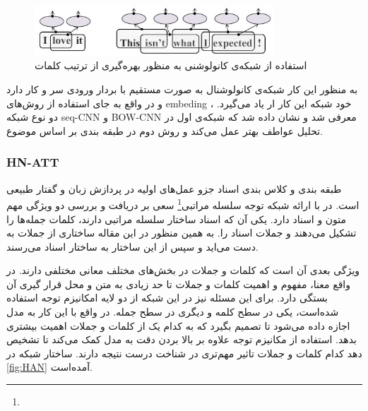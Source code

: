 \documentclass[12pt, a4paper, oneside]{report}
\begin{document}
\begin{figure}[!ht]
    \centering
    \includegraphics[width=0.8\textwidth]{cnn-in-text}
    \caption{ استفاده از شبکه‌ی کانولوشنی به منظور بهره‌گیری از ترتیب کلمات }
    \label{fig:cnn-in-text}
\end{figure}

به منظور این کار شبکه‌ی کانولوشنال به صورت مستقیم با بردار ورودی سر و کار دارد و در واقع به جای استفاده از
روش‌های
embeding
، خود شبکه این کار ار یاد می‌گیرد. دو نوع شبکه
seq-CNN
و
BOW-CNN
معرفی شد و نشان داده شد که شبکه‌ی اول در تحلیل عواطف بهتر عمل می‌کند و روش دوم در طبقه بندی بر اساس موضوع.
\cite{johnson-zhang-2015-effective}

\subsubsection{HN-ATT}

طبقه بندی و کلاس بندی اسناد جزو عمل‌های اولیه در پردازش زبان و گفتار طبیعی است.
در
\cite{yang-etal-2016-hierarchical}
با ارائه شبکه توجه سلسله مراتبی\footnote{}
سعی بر دریافت و بررسی دو ویژگی مهم متون و اسناد دارد. یکی آن که اسناد ساختار سلسله مراتبی دارند، 
کلمات جمله‌ها را تشکیل می‌دهند و جملات اسناد را. به همین منظور در این مقاله ساختاری از جملات به دست می‌اید
و سپس از این ساختار به ساختار اسناد می‌رسند.

ویژگی بعدی آن است که کلمات و جملات در بخش‌های مختلف معانی مختلفی دارند. در واقع معنا، مفهوم و اهمیت
کلمات و جملات تا حد زیادی به متن و محل قرار گیری آن بستگی دارد. برای این مسئله نیز در این شبکه از
دو لایه امکانیزم توجه استفاده شده‌است، یکی در سطح کلمه و دیگری در سطح جمله. در واقع با این کار
به مدل اجازه داده می‌شود تا تصمیم بگیرد که به کدام یک از کلمات و جملات اهمیت بیشتری بدهد.
استفاده از مکانیزم توجه علاوه بر بالا بردن دقت به مدل کمک می‌کند تا تشخیص دهد کدام کلمات و جملات
تاثیر مهم‌تری در شناخت درست نتیجه دارند. ساختار شبکه در
\ref{fig:HAN}
آمده‌است.
\end{document}
